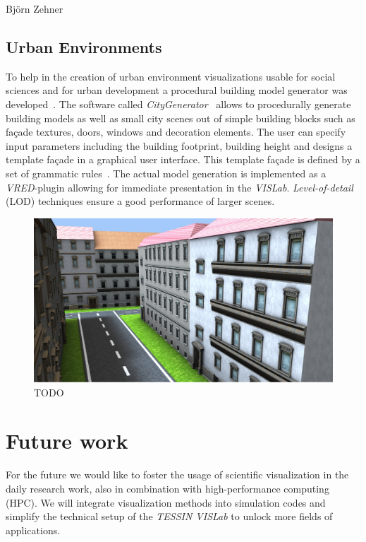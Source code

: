 \documentclass[twocolumn]{svjour3}          %
\begin{document}
Bj\"orn Zehner \cite{zehner:windpark}

\subsection{Urban Environments}
\label{urban-environments}


To help in the creation of urban environment visualizations usable for social sciences and for urban development a procedural building model generator was developed~\cite{bilke:master,procedural:modelling}. The software called \emph{CityGenerator}~\cite{bilke:citygenerator} allows to procedurally generate building models as well as small city scenes out of simple building blocks such as fa\c{c}ade textures, doors, windows and decoration elements. The user can specify input parameters including the building footprint, building height and designs a template fa\c{c}ade in a graphical user interface. This template fa\c{c}ade is defined by a set of grammatic rules~\cite{procedural:buildings}. The actual model generation is implemented as a \emph{VRED}-plugin allowing for immediate presentation in the \emph{VISLab}. \emph{Level-of-detail} (LOD) techniques ensure a good performance of larger scenes.

\begin{figure}
  \includegraphics[width=\linewidth]{images/city.jpg}
\caption{TODO}
\label{fig:city}
\end{figure}

\section{Future work}
\label{future-work}

For the future we would like to foster the usage of scientific visualization in the daily research work, also in combination with high-performance computing (HPC). We will integrate visualization methods into simulation codes and simplify the technical setup of the \emph{TESSIN VISLab} to unlock more fields of applications.
\end{document}

